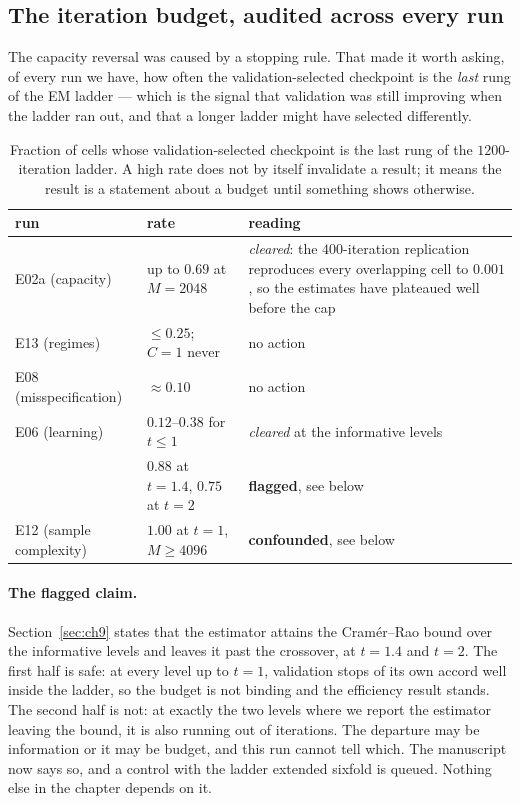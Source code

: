 \documentclass[11pt,a4paper]{article}
\begin{document}
\subsection{The iteration budget, audited across every run}\label{sec:budget}

The capacity reversal was caused by a stopping rule. That made it worth asking, of every run we
have, how often the validation-selected checkpoint is the \emph{last} rung of the EM ladder ---
which is the signal that validation was still improving when the ladder ran out, and that a longer
ladder might have selected differently.

\begin{table}[htbp]
\centering
\small
\caption{Fraction of cells whose validation-selected checkpoint is the last rung of the
$1200$-iteration ladder. A high rate does not by itself invalidate a result; it means the result is
a statement about a budget until something shows otherwise.}
\label{tab:atcap}
\begin{tabular}{@{}l l >{\raggedright\arraybackslash}p{6.1cm}@{}}
\toprule
run & rate & reading \\
\midrule
E02a (capacity)         & up to $0.69$ at $M=2048$            & \emph{cleared}: the $400$-iteration replication reproduces every overlapping cell to $0.001$, so the estimates have plateaued well before the cap \\[0.35em]
E13 (regimes)           & $\le 0.25$; $C=1$ never             & no action \\[0.2em]
E08 (misspecification)  & $\approx 0.10$                      & no action \\[0.2em]
E06 (learning)          & $0.12$--$0.38$ for $t\le1$          & \emph{cleared} at the informative levels \\
                        & $0.88$ at $t=1.4$, $0.75$ at $t=2$  & \textbf{flagged}, see below \\[0.2em]
E12 (sample complexity) & $1.00$ at $t=1$, $M\ge4096$         & \textbf{confounded}, see below \\
\bottomrule
\end{tabular}
\end{table}

\paragraph{The flagged claim.} Section~\ref{sec:ch9} states that the estimator attains the
Cram\'er--Rao bound over the informative levels and leaves it past the crossover, at $t=1.4$ and
$t=2$. The first half is safe: at every level up to $t=1$, validation stops of its own accord well
inside the ladder, so the budget is not binding and the efficiency result stands. The second half
is not: at exactly the two levels where we report the estimator leaving the bound, it is also
running out of iterations. The departure may be information or it may be budget, and this run
cannot tell which. The manuscript now says so, and a control with the ladder extended sixfold is
queued. Nothing else in the chapter depends on it.
\end{document}
